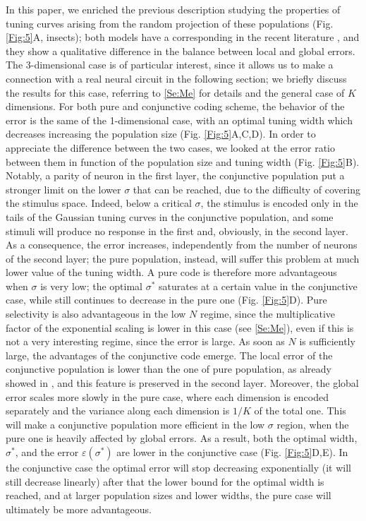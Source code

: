 \documentclass[a4paper]{article}
\begin{document}
In this paper, we enriched the previous description studying the properties of tuning curves arising from the random projection of these populations (Fig. \ref{Fig:5}A, insects); both models have a corresponding in the recent literature \cite[]{Bouchacourt2019AMemory,Lalazar2016TuningConnectivity}, and they show a qualitative difference in the balance between local and global errors.  The 3-dimensional case is of particular interest, since it allows us to make a connection with a real neural circuit in the following section; we briefly discuss the results for this case, referring to \ref{Se:Me} for  details and the general case of $K$ dimensions. 
For both pure and conjunctive coding scheme, the behavior of the error is the same of the 1-dimensional case, with an optimal tuning width which decreases increasing the population size (Fig. \ref{Fig:5}A,C,D).    In order to appreciate the difference between the two cases, we looked at the error ratio between them in function of the population size and tuning width (Fig. \ref{Fig:5}B).  Notably, a parity of neuron in the first layer, the conjunctive population put a stronger limit on the lower $\sigma$ that can be reached, due to the difficulty of covering the stimulus space. Indeed, below a critical $\sigma$, the stimulus is encoded only in the tails of the Gaussian tuning curves in the conjunctive population, and some stimuli will produce no response in the first and, obviously, in the second layer. As a consequence, the error increases, independently from the number of neurons of the second layer; the pure population, instead, will suffer this problem at much lower value of the tuning width. 
A pure code is therefore more advantageous when $\sigma$ is very low; the optimal $\sigma^*$  saturates at a certain value in the conjunctive case, while still continues to decrease in the pure one (Fig. \ref{Fig:5}D).  Pure selectivity is also advantageous in the low $N$ regime, since the multiplicative factor of the exponential scaling is lower in this case (see \ref{Se:Me}), even if this is not a very interesting regime, since the error is large. As soon as $N$ is sufficiently large, the advantages of the conjunctive code emerge. The local error of the conjunctive population is lower than the one of pure population, as already showed in \cite[]{Finkelstein2018OptimalBats}, and this feature is preserved in the second layer. Moreover, the global error scales more slowly in the pure case, where each dimension is encoded separately and the variance along each dimension is $1/K$ of the total one. This will make a conjunctive population more efficient in the low $\sigma$ region, when the pure one is heavily affected by global errors. As a result, both the optimal width, $\sigma^*$, and the error $\varepsilon(\sigma^*)$  are lower in the conjunctive case (Fig. \ref{Fig:5}D,E).  In the conjunctive case the optimal error will stop decreasing exponentially (it will still decrease linearly) after that the lower bound for the optimal width is reached, and at larger population sizes and lower widths, the pure case will ultimately be more advantageous.
\end{document}

